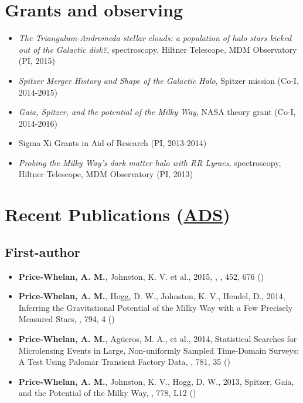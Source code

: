 \documentclass[12pt,letterpaper]{article}
\begin{document}
\section*{Grants and observing }
	\begin{itemize}
	\item {\it The Triangulum-Andromeda stellar clouds: a population of halo stars kicked out of the Galactic disk?}, spectroscopy, Hiltner Telescope, MDM Observatory (PI, 2015)
	\item {\it Spitzer Merger History and Shape of the Galactic Halo}, Spitzer mission (Co-I, 2014-2015)
	\item {\it Gaia, Spitzer, and the potential of the Milky Way}, NASA theory grant (Co-I, 2014-2016)
	\item Sigma Xi Grants in Aid of Research (PI, 2013-2014)
	\item {\it Probing the Milky Way's dark matter halo with RR Lyraes}, spectroscopy, Hiltner Telescope, MDM Observatory (PI, 2013)
	\end{itemize}

\section*{Recent Publications (\href{\adsurl}{ADS})}
	\subsection*{First-author}
	\begin{itemize}

\item {\bf Price-Whelan, A. M.}, Johnston, K. V. et al., 2015,
    ,
    \mnras, 452, 676 ()

\item {\bf Price-Whelan, A. M.}, Hogg, D. W., Johnston, K. V., Hendel, D., 2014,
    {Inferring the Gravitational Potential of the Milky Way with a Few Precisely Measured Stars},
    \apj, 794, 4 ()
    
\item {\bf Price-Whelan, A. M.}, Ag\"ueros, M. A., et al., 2014,
    {Statistical Searches for Microlensing Events in Large, Non-uniformly Sampled Time-Domain Surveys: A Test Using Palomar Transient Factory Data},
    \apj, 781, 35 ()
    
\item {\bf Price-Whelan, A. M.}, Johnston, K. V., Hogg, D. W., 2013,
    {Spitzer, Gaia, and the Potential of the Milky Way},
    \apjl, 778, L12 ()

	\end{itemize}
\end{document}
